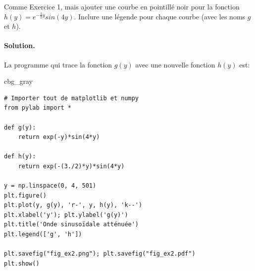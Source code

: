 \documentclass[%
oneside,                 %
final,                   %
10pt,french]{article}
\newenvironment{_cod_tight}[1]{
   \def\FrameCommand{\colorbox{#1}}
   \FrameRule0.6pt\MakeFramed {\FrameRestore}\vskip3mm}
   {\vskip0mm\endMakeFramed}
\newenvironment{cod}[1]{
\bgroup\rmfamily
\fboxsep=0mm\relax
\begin{_cod_tight}{#1}
\list{}{\parsep=-2mm\parskip=0mm\topsep=0pt\leftmargin=2mm
\rightmargin=2\leftmargin\leftmargin=4pt\relax}
\item\relax}
{\endlist\end{_cod_tight}\egroup}
\newenvironment{doconceexercise}{}{}
\newcounter{doconceexercisecounter}
\begin{document}
\begin{doconceexercise}



Comme Exercice 1, mais ajouter une courbe en pointillé noir pour la fonction $h(y) = e^{-\frac{3}{2}y} sin(4y)$. Inclure une légende pour chaque courbe (avec les noms $g$ et $h$).


\paragraph{Solution.}
La programme qui trace la fonction $g(y)$ avec une nouvelle fonction $h(y)$ est:
\begin{cod}{cbg_gray}\begin{verbatim}
# Importer tout de matplotlib et numpy
from pylab import *

def g(y):
    return exp(-y)*sin(4*y)

def h(y):
    return exp(-(3./2)*y)*sin(4*y)

y = np.linspace(0, 4, 501)
plt.figure()
plt.plot(y, g(y), 'r-', y, h(y), 'k--')
plt.xlabel('y'); plt.ylabel('g(y)')
plt.title('Onde sinusoïdale atténuée')
plt.legend(['g', 'h'])

plt.savefig("fig_ex2.png"); plt.savefig("fig_ex2.pdf")
plt.show()
\end{verbatim}
\end{cod}
\noindent


\end{doconceexercise}
\end{document}
